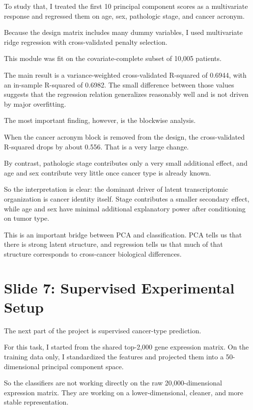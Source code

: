 \documentclass[12pt]{article}
\begin{document}
To study that, I treated the first 10 principal component scores as a multivariate response and regressed them on age, sex, pathologic stage, and cancer acronym.

Because the design matrix includes many dummy variables, I used multivariate ridge regression with cross-validated penalty selection.

This module was fit on the covariate-complete subset of 10,005 patients.

The main result is a variance-weighted cross-validated R-squared of 0.6944, with an in-sample R-squared of 0.6982. The small difference between those values suggests that the regression relation generalizes reasonably well and is not driven by major overfitting.

The most important finding, however, is the blockwise analysis.

When the cancer acronym block is removed from the design, the cross-validated R-squared drops by about 0.556. That is a very large change.

By contrast, pathologic stage contributes only a very small additional effect, and age and sex contribute very little once cancer type is already known.

So the interpretation is clear: the dominant driver of latent transcriptomic organization is cancer identity itself. Stage contributes a smaller secondary effect, while age and sex have minimal additional explanatory power after conditioning on tumor type.

This is an important bridge between PCA and classification. PCA tells us that there is strong latent structure, and regression tells us that much of that structure corresponds to cross-cancer biological differences.

\section{Slide 7: Supervised Experimental Setup}
The next part of the project is supervised cancer-type prediction.

For this task, I started from the shared top-2,000 gene expression matrix. On the training data only, I standardized the features and projected them into a 50-dimensional principal component space.

So the classifiers are not working directly on the raw 20,000-dimensional expression matrix. They are working on a lower-dimensional, cleaner, and more stable representation.
\end{document}
